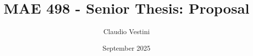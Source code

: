 \documentclass{article}
\numberwithin{equation}{section}
\numberwithin{figure}{section}
\numberwithin{table}{section}
\numberwithin{algorithm}{section}
\begin{document}
\title{MAE 498 - Senior Thesis: Proposal}
\author{Claudio Vestini}
\date{September 2025}
\maketitle
\end{document}
